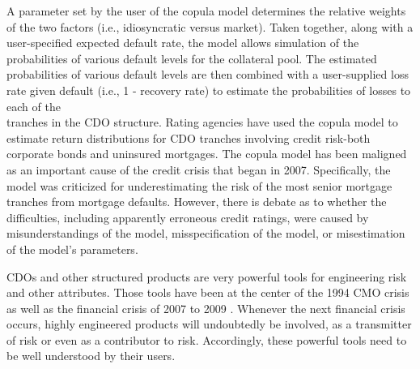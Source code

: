 \documentclass[11pt]{article}
\begin{document}
A parameter set by the user of the copula model determines the relative weights of the two factors (i.e., idiosyncratic versus market). Taken together, along with a user-specified expected default rate, the model allows simulation of the probabilities of various default levels for the collateral pool. The estimated probabilities of various default levels are then combined with a user-supplied loss rate given default (i.e., 1 - recovery rate) to estimate the probabilities of losses to each of the\\
tranches in the CDO structure. Rating agencies have used the copula model to estimate return distributions for CDO tranches involving credit risk-both corporate bonds and uninsured mortgages. The copula model has been maligned as an important cause of the credit crisis that began in 2007. Specifically, the model was criticized for underestimating the risk of the most senior mortgage tranches from mortgage defaults. However, there is debate as to whether the difficulties, including apparently erroneous credit ratings, were caused by misunderstandings of the model, misspecification of the model, or misestimation of the model's parameters.

CDOs and other structured products are very powerful tools for engineering risk and other attributes. Those tools have been at the center of the 1994 CMO crisis as well as the financial crisis of 2007 to 2009 . Whenever the next financial crisis occurs, highly engineered products will undoubtedly be involved, as a transmitter of risk or even as a contributor to risk. Accordingly, these powerful tools need to be well understood by their users.
\end{document}
